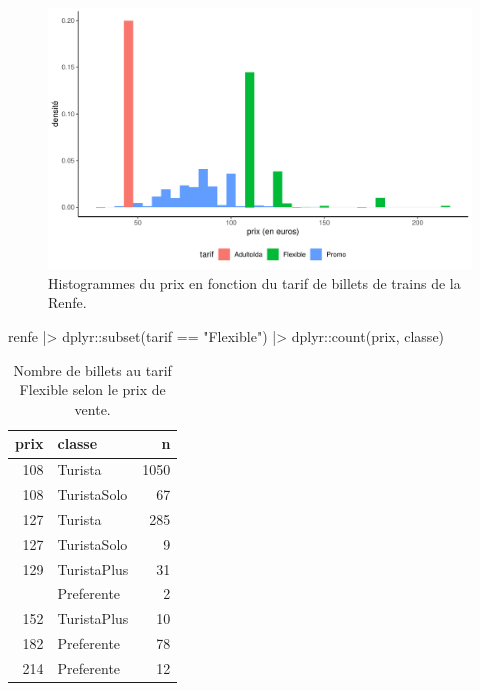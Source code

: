 \documentclass[
  11pt,
  letterpaper,
]{scrbook}
\newenvironment{Shaded}{\begin{snugshade}}{\end{snugshade}}
\newcommand{\FunctionTok}[1]{\textcolor[rgb]{0.28,0.35,0.67}{#1}}
\newcommand{\NormalTok}[1]{\textcolor[rgb]{0.00,0.23,0.31}{#1}}
\newcommand{\SpecialCharTok}[1]{\textcolor[rgb]{0.37,0.37,0.37}{#1}}
\newcommand{\StringTok}[1]{\textcolor[rgb]{0.13,0.47,0.30}{#1}}
\theoremstyle{definition}
\theoremstyle{remark}
\begin{document}
\begin{figure}[ht!]

{\centering \includegraphics[width=1\textwidth,height=\textheight]{analyseexploratoire_files/figure-pdf/fig-renfe-aed7-1.pdf}

}

\caption{\label{fig-renfe-aed7}Histogrammes du prix en fonction du tarif
de billets de trains de la Renfe.}

\end{figure}

\begin{Shaded}
\begin{Highlighting}[]
\NormalTok{renfe }\SpecialCharTok{|\textgreater{}}
\NormalTok{  dplyr}\SpecialCharTok{::}\FunctionTok{subset}\NormalTok{(tarif  }\SpecialCharTok{==} \StringTok{"Flexible"}\NormalTok{) }\SpecialCharTok{|\textgreater{}}
\NormalTok{  dplyr}\SpecialCharTok{::}\FunctionTok{count}\NormalTok{(prix, classe)}
\end{Highlighting}
\end{Shaded}

\hypertarget{tbl-renfeaedrep}{}
\begin{table}
\caption{\label{tbl-renfeaedrep}Nombre de billets au tarif Flexible selon le prix de vente. }\tabularnewline

\centering
\begin{tabular}[t]{rlr}
\toprule
prix & classe & n\\
\midrule
108 & Turista & 1050\\
108 & TuristaSolo & 67\\
127 & Turista & 285\\
127 & TuristaSolo & 9\\
129 & TuristaPlus & 31\\
\addlinespace
140 & Preferente & 2\\
152 & TuristaPlus & 10\\
182 & Preferente & 78\\
214 & Preferente & 12\\
\bottomrule
\end{tabular}
\end{table}
\end{document}
